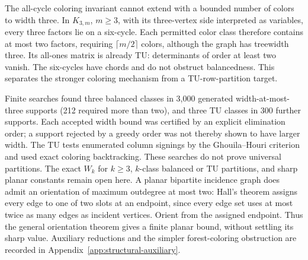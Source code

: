 The all-cycle coloring invariant cannot extend with a bounded number
of colors to width three. In $K_{3,m}$, $m\ge3$, with its three-vertex
side interpreted as variables, every three factors lie on a six-cycle.
Each permitted color class therefore contains at most two factors,
requiring $\lceil m/2\rceil$ colors, although the graph has treewidth
three. Its all-ones matrix is already TU: determinants of order at
least two vanish. The six-cycles have chords and do not obstruct
balancedness. This separates the stronger coloring mechanism from a
TU-row-partition target.

Finite searches found three balanced classes in 3,000 generated
width-at-most-three supports (212 required more than two), and three
TU classes in 300 further supports. Each accepted width bound was
certified by an explicit elimination order; a support rejected by a
greedy order was not thereby shown to have larger width. The TU tests
enumerated column signings by the Ghouila--Houri criterion and used
exact coloring backtracking. These searches do not prove universal
partitions. The exact $W_k$ for $k\ge3$, $k$-class balanced or TU partitions, and
sharp planar constants remain open here. A planar bipartite incidence
graph does admit an orientation of maximum outdegree at most two:
Hall's theorem assigns every edge to one of two slots at an endpoint,
since every edge set uses at most twice as many edges as incident
vertices. Orient from the assigned endpoint. Thus the general
orientation theorem gives a finite planar bound, without settling its
sharp value. Auxiliary reductions and the simpler forest-coloring
obstruction are recorded in Appendix~\ref{app:structural-auxiliary}.
